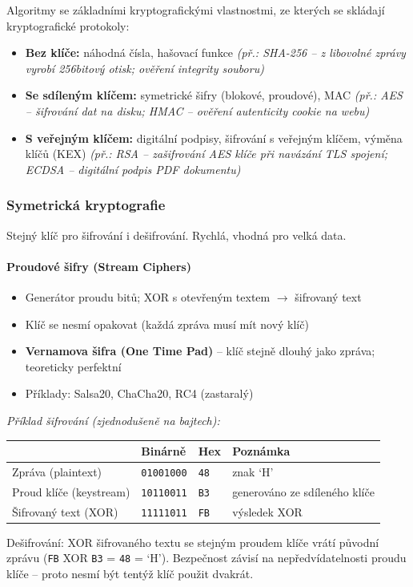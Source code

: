 Algoritmy se základními kryptografickými vlastnostmi, ze kterých se skládají kryptografické protokoly:

\begin{itemize}
  \item \textbf{Bez klíče:} náhodná čísla, hašovací funkce
    \textit{(př.: SHA-256 -- z libovolné zprávy vyrobí 256bitový otisk; ověření integrity souboru)}
  \item \textbf{Se sdíleným klíčem:} symetrické šifry (blokové, proudové), MAC
    \textit{(př.: AES -- šifrování dat na disku; HMAC -- ověření autenticity cookie na webu)}
  \item \textbf{S veřejným klíčem:} digitální podpisy, šifrování s veřejným klíčem, výměna klíčů (KEX)
    \textit{(př.: RSA -- zašifrování AES klíče při navázání TLS spojení; ECDSA -- digitální podpis PDF dokumentu)}
\end{itemize}

\subsubsection{Symetrická kryptografie}

Stejný klíč pro šifrování i dešifrování. Rychlá, vhodná pro velká data.

\paragraph{Proudové šifry (Stream Ciphers)}
\begin{itemize}
  \item Generátor proudu bitů; XOR s otevřeným textem $\to$ šifrovaný text
  \item Klíč se nesmí opakovat (každá zpráva musí mít nový klíč)
  \item \textbf{Vernamova šifra (One Time Pad)} -- klíč stejně dlouhý jako zpráva; teoreticky perfektní
  \item Příklady: Salsa20, ChaCha20, RC4 (zastaralý)
\end{itemize}

\textit{Příklad šifrování (zjednodušeně na bajtech):}
\begin{center}\footnotesize
\begin{tabular}{llll}
\toprule
 & \textbf{Binárně} & \textbf{Hex} & \textbf{Poznámka} \\
\midrule
Zpráva (plaintext) & \texttt{01001000} & \texttt{48} & znak `H' \\
Proud klíče (keystream) & \texttt{10110011} & \texttt{B3} & generováno ze sdíleného klíče \\
Šifrovaný text (XOR) & \texttt{11111011} & \texttt{FB} & výsledek XOR \\
\bottomrule
\end{tabular}
\end{center}
Dešifrování: XOR šifrovaného textu se stejným proudem klíče vrátí původní zprávu (\texttt{FB} XOR \texttt{B3} = \texttt{48} = `H').
Bezpečnost závisí na nepředvídatelnosti proudu klíče -- proto nesmí být tentýž klíč použit dvakrát.

